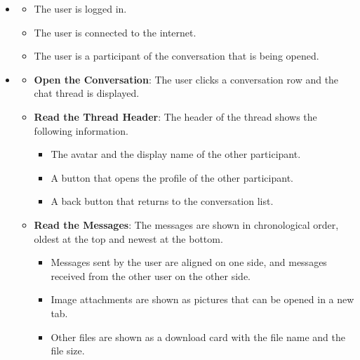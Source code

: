 \begin{itemize}[leftmargin=1.6em,topsep=4pt,itemsep=3pt,parsep=0pt,label=$\bullet$]
    \item {}

        \begin{itemize}[leftmargin=2.2em,topsep=2pt,itemsep=3pt,parsep=0pt,label=$\circ$]
            \item The user is logged in.
            \item The user is connected to the internet.
            \item The user is a participant of the conversation that is being opened.
        \end{itemize}
    \item {}

        \begin{itemize}[leftmargin=2.2em,topsep=2pt,itemsep=3pt,parsep=0pt,label=$\circ$]
            \item \textbf{Open the Conversation}: The user clicks a conversation row and the chat thread is displayed.
            \item \textbf{Read the Thread Header}: The header of the thread shows the following information.
                \begin{itemize}[leftmargin=2.2em,topsep=2pt,itemsep=3pt,parsep=0pt,label=$\blacksquare$]
                    \item The avatar and the display name of the other participant.
                    \item A button that opens the profile of the other participant.
                    \item A back button that returns to the conversation list.
                \end{itemize}
            \item \textbf{Read the Messages}: The messages are shown in chronological order, oldest at the top and newest at the bottom.
                \begin{itemize}[leftmargin=2.2em,topsep=2pt,itemsep=3pt,parsep=0pt,label=$\blacksquare$]
                    \item Messages sent by the user are aligned on one side, and messages received from the other user on the other side.
                    \item Image attachments are shown as pictures that can be opened in a new tab.
                    \item Other files are shown as a download card with the file name and the file size.

\end{itemize}
\end{itemize}
\end{itemize}
